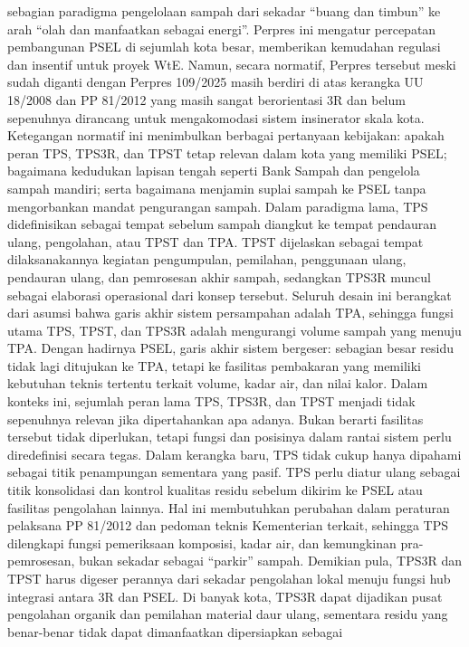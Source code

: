 \documentclass[
  letterpaper,
  DIV=11,
  numbers=noendperiod]{scrreprt}
\begin{document}
sebagian paradigma pengelolaan sampah dari sekadar ``buang dan timbun''
ke arah ``olah dan manfaatkan sebagai energi''. Perpres ini mengatur
percepatan pembangunan PSEL di sejumlah kota besar, memberikan kemudahan
regulasi dan insentif untuk proyek WtE. Namun, secara normatif, Perpres
tersebut meski sudah diganti dengan Perpres 109/2025 masih berdiri di
atas kerangka UU 18/2008 dan PP 81/2012 yang masih sangat berorientasi
3R dan belum sepenuhnya dirancang untuk mengakomodasi sistem insinerator
skala kota. Ketegangan normatif ini menimbulkan berbagai pertanyaan
kebijakan: apakah peran TPS, TPS3R, dan TPST tetap relevan dalam kota
yang memiliki PSEL; bagaimana kedudukan lapisan tengah seperti Bank
Sampah dan pengelola sampah mandiri; serta bagaimana menjamin suplai
sampah ke PSEL tanpa mengorbankan mandat pengurangan sampah. Dalam
paradigma lama, TPS didefinisikan sebagai tempat sebelum sampah diangkut
ke tempat pendauran ulang, pengolahan, atau TPST dan TPA. TPST
dijelaskan sebagai tempat dilaksanakannya kegiatan pengumpulan,
pemilahan, penggunaan ulang, pendauran ulang, dan pemrosesan akhir
sampah, sedangkan TPS3R muncul sebagai elaborasi operasional dari konsep
tersebut. Seluruh desain ini berangkat dari asumsi bahwa garis akhir
sistem persampahan adalah TPA, sehingga fungsi utama TPS, TPST, dan
TPS3R adalah mengurangi volume sampah yang menuju TPA. Dengan hadirnya
PSEL, garis akhir sistem bergeser: sebagian besar residu tidak lagi
ditujukan ke TPA, tetapi ke fasilitas pembakaran yang memiliki kebutuhan
teknis tertentu terkait volume, kadar air, dan nilai kalor. Dalam
konteks ini, sejumlah peran lama TPS, TPS3R, dan TPST menjadi tidak
sepenuhnya relevan jika dipertahankan apa adanya. Bukan berarti
fasilitas tersebut tidak diperlukan, tetapi fungsi dan posisinya dalam
rantai sistem perlu diredefinisi secara tegas. Dalam kerangka baru, TPS
tidak cukup hanya dipahami sebagai titik penampungan sementara yang
pasif. TPS perlu diatur ulang sebagai titik konsolidasi dan kontrol
kualitas residu sebelum dikirim ke PSEL atau fasilitas pengolahan
lainnya. Hal ini membutuhkan perubahan dalam peraturan pelaksana PP
81/2012 dan pedoman teknis Kementerian terkait, sehingga TPS dilengkapi
fungsi pemeriksaan komposisi, kadar air, dan kemungkinan pra-pemrosesan,
bukan sekadar sebagai ``parkir'' sampah. Demikian pula, TPS3R dan TPST
harus digeser perannya dari sekadar pengolahan lokal menuju fungsi hub
integrasi antara 3R dan PSEL. Di banyak kota, TPS3R dapat dijadikan
pusat pengolahan organik dan pemilahan material daur ulang, sementara
residu yang benar-benar tidak dapat dimanfaatkan dipersiapkan sebagai
\end{document}
